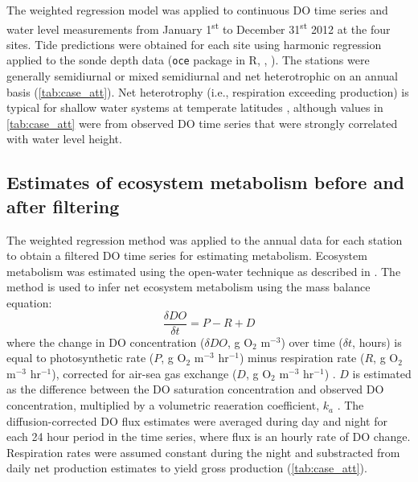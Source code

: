 \documentclass[letterpaper,12pt,oneside]{article}\usepackage[]{graphicx}\usepackage[]{color}
\begin{document}
The weighted regression model was applied to continuous \ac{DO} time series and water level measurements from January 1\textsuperscript{st} to December 31\textsuperscript{st} 2012 at the four sites.  Tide predictions were obtained for each site using harmonic regression applied to the sonde depth data (\texttt{oce} package in R, \citealt{Foreman89}, ). The stations were generally semidiurnal or mixed semidiurnal and net heterotrophic on an annual basis (\cref{tab:case_att}).  Net heterotrophy (i.e., respiration exceeding production) is typical for shallow water systems at temperate latitudes \citep{Caffrey03}, although values in \cref{tab:case_att} were from observed \ac{DO} time series that were strongly correlated with water level height.

\subsection{Estimates of ecosystem metabolism before and after filtering} \label{met_sec}

The weighted regression method was applied to the annual data for each station to obtain a filtered \ac{DO} time series for estimating metabolism.  Ecosystem metabolism was estimated using the open-water technique \citep{Odum56} as described in \citet{Caffrey13}.  The method is used to infer net ecosystem metabolism using the mass balance equation:
\begin{equation} \label{metrate}
\frac{\delta DO}{\delta t} = P - R + D
\end{equation}
where the change in \ac{DO} concentration ($\delta DO$, g O$_2$ m$^{-3}$) over time ($\delta t$, hours) is equal to photosynthetic rate ($P$, g O$_2$ m$^{-3}$ hr$^{-1}$) minus respiration rate ($R$, g O$_2$ m$^{-3}$ hr$^{-1}$), corrected for air-sea gas exchange ($D$, g O$_2$ m$^{-3}$ hr$^{-1}$) \citep{Caffrey13}. $D$ is estimated as the difference between the \ac{DO} saturation concentration and observed \ac{DO} concentration, multiplied by a volumetric reaeration coefficient, $k_a$ \citep{Thebault08}.  The diffusion-corrected \ac{DO} flux estimates were averaged during day and night for each 24 hour period in the time series, where flux is an hourly rate of \ac{DO} change.  Respiration rates were assumed constant during the night and substracted from daily net production estimates to yield gross production (\cref{tab:case_att}).  
\end{document}
